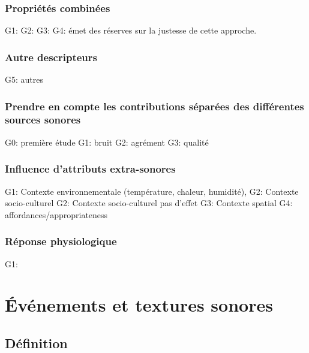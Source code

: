 \subsubsection{Propriétés combinées}

G1: \citep{davies2013perception}
G2: \citep{cain2013development}
G3: \citep{axelsson2010principal}
G4: \citep{hall2013exploratory} émet des réserves sur la justesse de cette approche.

\subsubsection{Autre descripteurs}

G5: \citep{kang2010semantic} autres

\subsubsection{Prendre en compte les contributions séparées des différentes sources sonores}

G0: \citep{defreville2004aactivity} première étude
G1: \citep{marquis2015simulated} bruit
G2:  \citep{lavandier2006contribution,guillen2007importance} agrément
G3:  \citep{nilsson2007soundscape,ricciardi2015sound} qualité

\subsubsection{Influence d'attributs extra-sonores}

G1: Contexte environnementale (température, chaleur, humidité), \citep{meng2013field,jeon2011non}
G2: Contexte socio-culturel \citep{hall2013exploratory,yu2010factors}
G2: Contexte socio-culturel \citep{guillen2007importance} pas d'effet
G3: Contexte spatial \citep{hall2013exploratory}
G4: affordances/appropriateness \citep{hall2013exploratory}

\subsubsection{Réponse physiologique}

G1: \citep{hume2013physiological}

\section{Événements et textures sonores}

\subsection{Définition}

